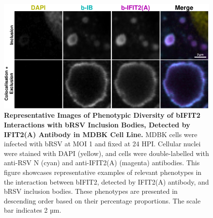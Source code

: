\begin{figure}
    \centering
    \includegraphics[width=1\linewidth]{08. Chapter 3/Figs/02. Infection/02. IFIT2/01. IFIT2A/15. i2a mdbk brsv.pdf} 
    \caption[Representative Images of Phenotypic Diversity of bIFIT2 Interactions with bRSV Inclusion Bodies, Detected by IFIT2(A) Antibody in MDBK Cell Line.]{\textbf{Representative Images of Phenotypic Diversity of bIFIT2 Interactions with bRSV Inclusion Bodies, Detected by IFIT2(A) Antibody in MDBK Cell Line.} MDBK cells were infected with bRSV at MOI 1 and fixed at 24 HPI. Cellular nuclei were stained with DAPI (yellow), and cells were double-labelled with anti-RSV N (cyan) and anti-IFIT2(A) (magenta) antibodies. This figure showcases representative examples of relevant phenotypes in the interaction between bIFIT2, detected by IFIT2(A) antibody, and bRSV inclusion bodies. These phenotypes are presented in descending order based on their percentage proportions. The scale bar indicates 2 µm.}
    \label{fig:Representative Images of Phenotypic Diversity of bIFIT2 Interactions with bRSV Inclusion Bodies, Detected by IFIT2(A) Antibody in MDBK Cell Line}
\end{figure}

